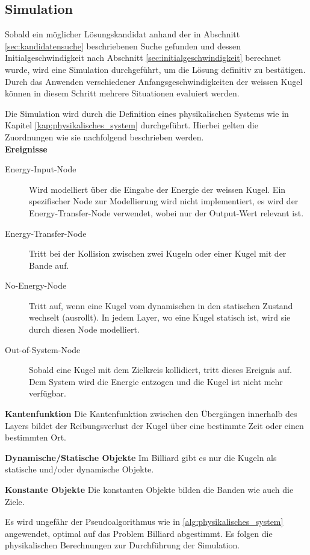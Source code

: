\subsection{Simulation}\label{kap:simulation}
Sobald ein möglicher Lösungskandidat anhand der in Abschnitt \ref{sec:kandidatensuche} beschriebenen Suche gefunden
und dessen Initialgeschwindigkeit nach Abschnitt \ref{sec:initialgeschwindigkeit} berechnet wurde,
wird eine Simulation durchgeführt, um die Lösung definitiv zu bestätigen.
Durch das Anwenden verschiedener Anfangsgeschwindigkeiten der weissen Kugel können in diesem Schritt mehrere Situationen evaluiert werden.

Die Simulation wird durch die Definition eines physikalischen Systems wie in Kapitel \ref{kap:physikalisches_system} durchgeführt.
Hierbei gelten die Zuordnungen wie sie nachfolgend beschrieben werden.\\
\textbf{Ereignisse}
\begin{description}
    \item[Energy-Input-Node] Wird modelliert über die Eingabe der Energie der weissen Kugel. Ein spezifischer Node zur
    Modellierung wird nicht implementiert, es wird der Energy-Transfer-Node verwendet, wobei nur der Output-Wert relevant ist.
    \item[Energy-Transfer-Node] Tritt bei der Kollision zwischen zwei Kugeln oder einer Kugel mit der Bande auf.
    \item[No-Energy-Node] Tritt auf, wenn eine Kugel vom dynamischen in den statischen Zustand wechselt (ausrollt). In jedem
    Layer, wo eine Kugel statisch ist, wird sie durch diesen Node modelliert.
    \item[Out-of-System-Node] Sobald eine Kugel mit dem Zielkreis kollidiert, tritt dieses Ereignis auf. Dem System wird die
    Energie entzogen und die Kugel ist nicht mehr verfügbar.
\end{description}

\textbf{Kantenfunktion}
Die Kantenfunktion zwischen den Übergängen innerhalb des Layers bildet der Reibungsverlust der
Kugel über eine bestimmte Zeit oder einen bestimmten Ort.

\textbf{Dynamische/Statische Objekte}
Im Billiard gibt es nur die Kugeln als statische und/oder dynamische Objekte.

\textbf{Konstante Objekte}
Die konstanten Objekte bilden die Banden wie auch die Ziele.

Es wird ungefähr der Pseudoalgorithmus wie in \ref{alg:physikalisches_system} angewendet, optimal auf das Problem \glqq{}Billiard\grqq{}
abgestimmt. Es folgen die physikalischen Berechnungen zur Durchführung der Simulation.


